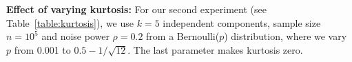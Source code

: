 \documentclass[letterpaper]{article}
\newcommand{\rd}{\color{red}}
\newcommand{\bk}{\color{black}}
\begin{document}
\textbf{Effect of varying kurtosis:}
For our second experiment (see Table~\ref{table:kurtosis}), we use $k=5$ independent components, sample size $n=10^5$ and noise power $\rho=0.2$ from a Bernoulli($p$) distribution, where we vary $p$ from 0.001 to $0.5-1/\sqrt{12}$. The last parameter makes kurtosis zero.
\begin{table}[!hbt]
    \hspace{-1cm}
   \begin{tabular}{|c|c|c|c|c|c|c|c|c|c|c|}\hline

\end{tabular}
\end{table}
\end{document}
